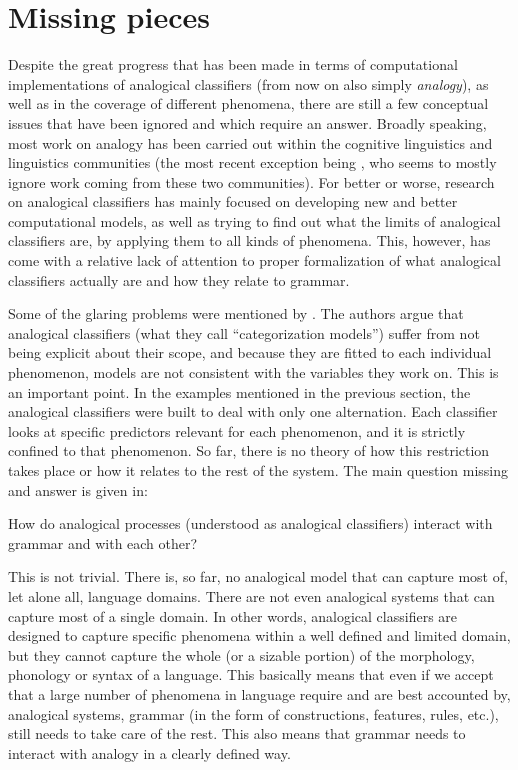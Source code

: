 \section{Missing pieces}

Despite the great progress that has been made in terms of computational implementations of analogical classifiers (from now on also simply \textit{analogy}), as well as in the coverage of different phenomena, there are still a few conceptual issues that have been ignored and which require an answer. Broadly speaking, most work on analogy has been carried out within the cognitive linguistics and  linguistics communities (the most recent exception being \textcite{Gouskova.2015}, who seems to mostly ignore work coming from these two communities). For better or worse, research on analogical classifiers has mainly focused on developing new and better computational models, as well as trying to find out what the limits of analogical classifiers are, by applying them to all kinds of phenomena. This, however, has come with a relative lack of attention to proper formalization of what analogical classifiers actually are and how they relate to grammar.

Some of the glaring problems were mentioned by \textcite{Wills.2012}. The authors argue that analogical classifiers (what they call ``categorization models'') suffer from not being explicit about their scope, and because they are fitted to each individual phenomenon, models are not consistent with the variables they work on. This is an important point. In the examples mentioned in the previous section, the analogical classifiers were built to deal with only one alternation. Each classifier looks at specific predictors relevant for each phenomenon, and it is strictly confined to that phenomenon. So far, there is no theory of how this restriction takes place or how it relates to the rest of the system. The main question missing and answer is given in:

\begin{exe}
    \ex \label{question} How do analogical processes (understood as analogical classifiers) interact with grammar and with each other?
\end{exe}

This is not trivial. There is, so far, no analogical model that can capture most of, let alone all, language domains. There are not even analogical systems that can capture most of a single domain. In other words, analogical classifiers are designed to capture specific phenomena within a well defined and limited domain, but they cannot capture the whole (or a sizable portion) of the morphology, phonology or syntax of a language. This basically means that even if we accept that a large number of phenomena in language require and are best accounted by, analogical systems, grammar (in the form of constructions, features, rules, etc.), still needs to take care of the rest. This also means that grammar needs to interact with analogy in a clearly defined way.


